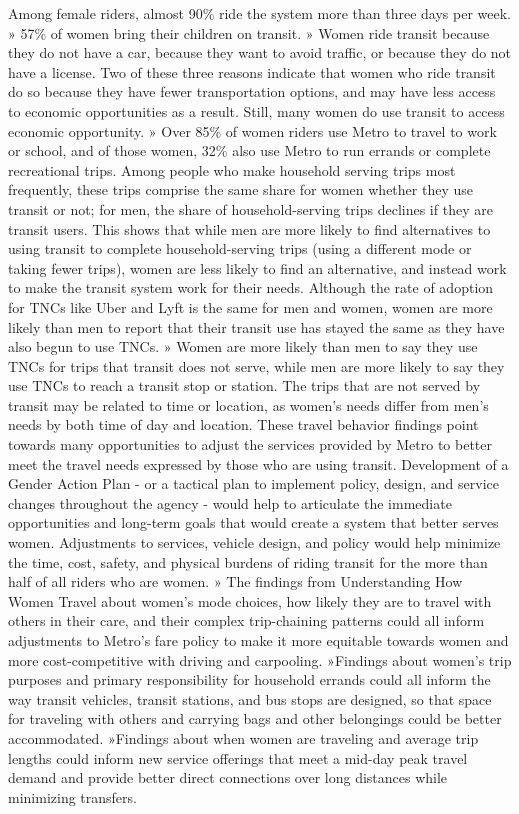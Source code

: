 \documentclass[
  12pt,
]{article}
\begin{document}
Among female riders, almost 90\% ride the system more than three days
per week. » 57\% of women bring their children on transit. » Women ride
transit because they do not have a car, because they want to avoid
traffic, or because they do not have a license. Two of these three
reasons indicate that women who ride transit do so because they have
fewer transportation options, and may have less access to economic
opportunities as a result. Still, many women do use transit to access
economic opportunity. » Over 85\% of women riders use Metro to travel to
work or school, and of those women, 32\% also use Metro to run errands
or complete recreational trips. Among people who make household serving
trips most frequently, these trips comprise the same share for women
whether they use transit or not; for men, the share of household-serving
trips declines if they are transit users. This shows that while men are
more likely to find alternatives to using transit to complete
household-serving trips (using a different mode or taking fewer trips),
women are less likely to find an alternative, and instead work to make
the transit system work for their needs. Although the rate of adoption
for TNCs like Uber and Lyft is the same for men and women, women are
more likely than men to report that their transit use has stayed the
same as they have also begun to use TNCs. » Women are more likely than
men to say they use TNCs for trips that transit does not serve, while
men are more likely to say they use TNCs to reach a transit stop or
station. The trips that are not served by transit may be related to time
or location, as women's needs differ from men's needs by both time of
day and location. These travel behavior findings point towards many
opportunities to adjust the services provided by Metro to better meet
the travel needs expressed by those who are using transit. Development
of a Gender Action Plan - or a tactical plan to implement policy,
design, and service changes throughout the agency - would help to
articulate the immediate opportunities and long-term goals that would
create a system that better serves women. Adjustments to services,
vehicle design, and policy would help minimize the time, cost, safety,
and physical burdens of riding transit for the more than half of all
riders who are women. » The findings from Understanding How Women Travel
about women's mode choices, how likely they are to travel with others in
their care, and their complex trip-chaining patterns could all inform
adjustments to Metro's fare policy to make it more equitable towards
women and more cost-competitive with driving and carpooling. »Findings
about women's trip purposes and primary responsibility for household
errands could all inform the way transit vehicles, transit stations, and
bus stops are designed, so that space for traveling with others and
carrying bags and other belongings could be better accommodated.
»Findings about when women are traveling and average trip lengths could
inform new service offerings that meet a mid-day peak travel demand and
provide better direct connections over long distances while minimizing
transfers.
\end{document}
